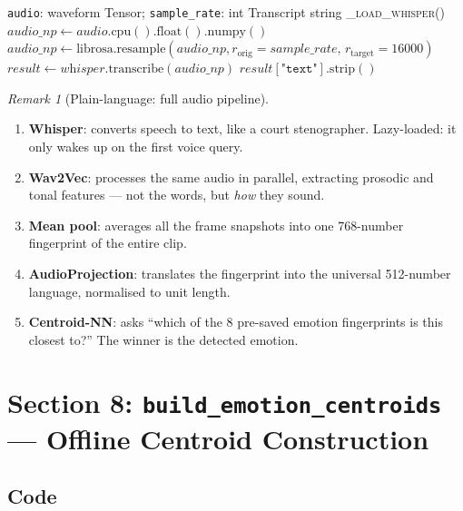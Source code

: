 \documentclass[12pt,a4paper]{article}
\theoremstyle{definition}
\theoremstyle{remark}
\newtheorem{remark}[theorem]{Remark}
\begin{document}
\begin{algorithm}[H]
\caption{\texttt{AudioEncoderV2.transcribe}(audio, sample\_rate)}
\label{alg:transcribe}
\begin{algorithmic}[1]
\Require \texttt{audio}: waveform Tensor; \texttt{sample\_rate}: int
\Ensure Transcript string
\State \textsc{\_load\_whisper}()
\State $\textit{audio\_np} \gets \textit{audio}.\text{cpu}().\text{float}().\text{numpy}()$
  \State $\textit{audio\_np} \gets \text{librosa.resample}(\textit{audio\_np},
         r_{\text{orig}}=\textit{sample\_rate},\, r_{\text{target}}=16000)$
\EndIf
\State $\textit{result} \gets \textit{whisper}.\text{transcribe}(\textit{audio\_np})$
\State \Return $\textit{result}[\texttt{"text"}].\text{strip}()$
\end{algorithmic}
\end{algorithm}

\begin{remark}[Plain-language: full audio pipeline]
\begin{enumerate}
  \item \textbf{Whisper}: converts speech to text, like a court stenographer.
        Lazy-loaded: it only wakes up on the first voice query.
  \item \textbf{Wav2Vec}: processes the same audio in parallel, extracting
        prosodic and tonal features — not the words, but \emph{how} they sound.
  \item \textbf{Mean pool}: averages all the frame snapshots into one
        768-number fingerprint of the entire clip.
  \item \textbf{AudioProjection}: translates the fingerprint into the
        universal 512-number language, normalised to unit length.
  \item \textbf{Centroid-NN}: asks ``which of the 8 pre-saved emotion
        fingerprints is this closest to?''
        The winner is the detected emotion.
\end{enumerate}
\end{remark}

\section{Section 8: \texttt{build\_emotion\_centroids} — Offline Centroid Construction}

\subsection{Code}
\end{document}
